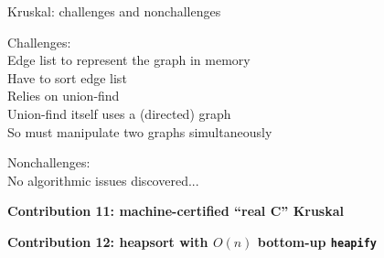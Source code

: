 \documentclass[usenames, xcolor=dvipsnames]{beamer}
\newcommand{\hide}[1]{}
\newcommand{\m}[1]{\ensuremath{\mathit{#1}}} %
\begin{document}
\begin{frame}{Kruskal: challenges and nonchallenges}

Challenges: \\ \pause
\hspace{1em} Edge list to represent the graph in memory \\ \pause
\hspace{1em} Have to sort edge list \\ \pause
\hspace{1em} Relies on union-find \\ \pause
\hspace{1em} Union-find itself uses a (directed) graph \\ \pause
\hspace{1em} So must manipulate two graphs simultaneously \\ \pause

\bigskip

Nonchallenges: \\ \pause
\hspace{1em} No algorithmic issues discovered... \\ \pause

\bigskip

{\textbf{Contribution 11: machine-certified ``real C'' Kruskal}} \pause

\bigskip

{\textbf{Contribution 12: heapsort with $O(n)$ bottom-up \texttt{heapify}}}


\hide{
Extend spatial support: \\
\hspace{1em} lay out edgelist-represented graphs in memory \\
\hspace{1em} develop fold-unfold utilities in separation logic

\bigskip

The undirected development carries over wholesale

\bigskip

Manipulate two graphs simultaneously: \\
\hspace{1em}directed graph with vertex labels (stores parents and ranks) \\
\hspace{1em}undirected graph with edge labels (for which we construct an MSF)
}
\end{frame}

\hide{
\begin{frame}{Kruksal: layering undirectedness atop of union-find}
  We have just performed $\texttt{union}^{d}$ \m{a} \m{b} \\
  \vspace{2em}
  {\centering
  

  }
 \pause \bigskip
  What can we say about $\texttt{connected}^{u}$ \m{a} \m{b}? \uncover<3>{$\texttt{connected}^{u}$ \m{c} \m{b}?}
\end{frame}
}
\end{document}
